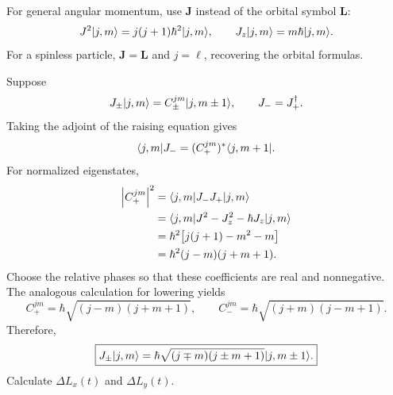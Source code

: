 For general angular momentum, use $\mathbf J$ instead of the orbital
symbol $\mathbf L$:
\[
 J^2\lvert j,m\rangle=j(j+1)\hbar^2\lvert j,m\rangle,\qquad
 J_z\lvert j,m\rangle=m\hbar\lvert j,m\rangle.
\]
For a spinless particle, $\mathbf J=\mathbf L$ and $j=\ell$, recovering
the orbital formulas.

Suppose
\[
 J_\pm\lvert j,m\rangle=C_\pm^{jm}\lvert j,m\pm1\rangle,\qquad J_-=J_+^\dagger.
\]
Taking the adjoint of the raising equation gives
\[
 \langle j,m\rvert J_-=(C_+^{jm})^*\langle j,m+1\rvert.
\]
For normalized eigenstates,
\begin{align*}
 \left\lvert C_+^{jm}\right\rvert^2
 &=\langle j,m\rvert J_-J_+\lvert j,m\rangle\\
 &=\langle j,m\rvert J^2-J_z^2-\hbar J_z\lvert j,m\rangle\\
 &=\hbar^2\bigl[j(j+1)-m^2-m\bigr]\\
 &=\hbar^2(j-m)(j+m+1).
\end{align*}
Choose the relative phases so that these coefficients are real and
nonnegative. The analogous calculation for lowering yields
\[
 C_+^{jm}=\hbar\sqrt{(j-m)(j+m+1)},\qquad
 C_-^{jm}=\hbar\sqrt{(j+m)(j-m+1)}.
\]
Therefore,
\[
 \boxed{J_\pm\lvert j,m\rangle
 =\hbar\sqrt{(j\mp m)(j\pm m+1)}\lvert j,m\pm1\rangle.}
\]
Calculate $\Delta L_x(t)$ and $\Delta L_y(t)$.
